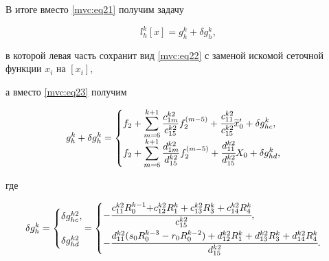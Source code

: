 В итоге вместо \eqref{mvc:eq21}  получим задачу

\begin{equation}

\label{mvc:eq36}

   l_{h}^k[x]=g_{h}^k+\delta g_{h}^k,

\end{equation}

в которой левая часть сохранит вид \eqref{mvc:eq22} с заменой искомой сеточной функции $x_i$ на  $[x_i]$,

а вместо \eqref{mvc:eq23} получим

\begin{equation}

\label{mvc:eq37}

   g_{h}^k+   \delta g_{h}^k=

\begin{cases}

\displaystyle f_{2}+\sum_{m=6}^{k+1}\frac{c_{1m}^{k2}}{c_{15}^{k2}} 

f_2^{(m-5)}+\cfrac{c_{11}^{k2}}{c_{15}^{k2}} \widetilde{x}_0'+\delta g_{hc}^k,

\\[2mm]

\displaystyle f_{2}+\sum_{m=6}^{k+1}\frac{d_{1m}^{k2}}{d_{15}^{k2}} 

f_2^{(m-5)}+\cfrac{d_{11}^{k2}}{d_{15}^{k2}} X_0+\delta g_{hd}^k,

\end{cases}

\end{equation}

где

\begin{equation}

\label{mvc:eq38}

   \delta g_{h}^k=

\begin{cases}

\delta g_{hc}^{k2},

\\[4mm]  

\delta g_{hd}^{k2}

\end{cases} \hspace{-4mm} =

\begin{cases}

   -\cfrac{c_{11}^{k2} R_{0}^{k-1}{+}c_{12}^{k2} R_{1}^k + c_{13}^{k2} R_{3}^k + 

   c_{14}^{k2} R_{4}^k}{c_{15}^{k2}},

\\[3mm] 

-\cfrac{d_{11}^{k2} (s_0R_{0}^{k-3} - r_0R_{0}^{k-2})+ d_{12}^{k2} R_{1}^k + d_{13}^{k2} R_{3}^k + d_{14}^{k2} R_{4}^k}{d_{15}^{k2}}.

\end{cases}

\end{equation}



